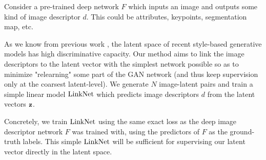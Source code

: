 Consider a pre-trained deep network $F$ which inputs an image and outputs some kind of image descriptor $d$. This could be attributes, keypoints, segmentation map, etc. 

As we know from previous work \citep{xu2021generative}, the latent space of recent 
style-based generative models has high discriminative capacity. Our method aims to 
link the image descriptors to the latent vector with the simplest network possible 
so as to minimize "relearning" some part of the GAN network (and thus keep 
supervision only at the coarsest latent-level). We generate $N$ image-latent pairs and train a
 simple linear model $\mathrm{LinkNet}$ which predicts image descriptors $d$ from the latent 
 vectors $\mathbf{z}$.

Concretely, we train $\mathrm{LinkNet}$ using the same exact loss as the deep image descriptor network $F$ was trained with, using the predictors of $F$ as the ground-truth labels. This simple $\mathrm{LinkNet}$ will be sufficient for supervising our latent vector directly in the latent space.















